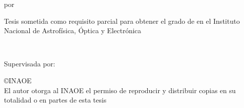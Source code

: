 \documentclass[12pt,letterpaper]{article}
\begin{document}
\pagestyle{empty}
\hspace{2.3cm}
\begin{minipage}[b][\textheight][c]{12cm}
    \begin{center}\Large
        {\Huge\bfseries\Ptitle\par}
        por\\
        {\LARGE \bfseries\Pauthor\par}
        \begin{normalsize}Tesis sometida como requisito parcial para obtener el grado de \textbf{\Pdegree} en el Instituto Nacional de Astrof\'isica, \'Optica y Electr\'onica \end{normalsize} \\ 
	\hspace*{1in}
	
        Supervisada por: \\
        {\bfseries\Padviser\par}
	\hspace*{1in}
	{\par}
        \begin{normalsize}{\copyright INAOE~\Pyear\\El autor otorga al INAOE el permiso de reproducir y distribuir copias en su totalidad o en partes de esta tesis\par}        \end{normalsize}
    \end{center}
\end{minipage}
\end{document}
